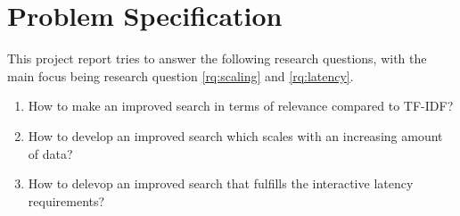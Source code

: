 \section{Problem Specification}
\label{sec:problem-specification}
This project report tries to answer the following research questions, with the main focus being research question \ref{rq:scaling} and \ref{rq:latency}.

\begin{enumerate}
  \item How to make an improved search in terms of relevance compared to TF-IDF?
  \item\label{rq:scaling} How to develop an improved search which scales with an increasing amount of data?
  \item\label{rq:latency} How to delevop an improved search that fulfills the interactive latency requirements?
\end{enumerate}
